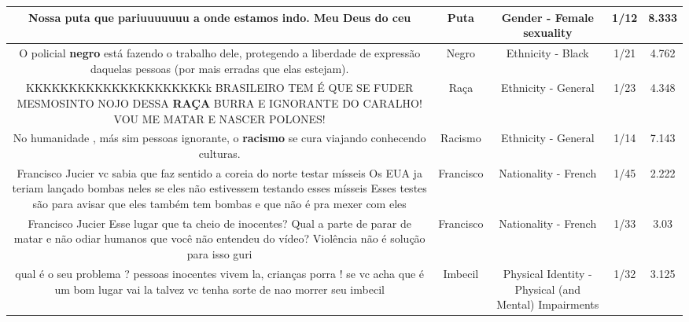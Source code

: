 \documentclass[11pt]{article}
\newlength\mylength
\begin{document}
\begin{center}
\begin{longtable}{|C{.65\mylength}|C{.30\mylength}|C{.12\mylength}|C{.12\mylength}|C{.12\mylength}|}
  \small Nossa \textbf{puta} que pariuuuuuuu  a onde estamos indo. Meu Deus do ceu\normalsize   & Puta & Gender - Female sexuality & 1/12 & 8.333 \\  \hline
  \small O policial \textbf{negro} está fazendo o trabalho dele, protegendo a liberdade de expressão daquelas pessoas (por mais erradas que elas estejam).\normalsize   & Negro & Ethnicity - Black & 1/21 & 4.762 \\  \hline
  \small KKKKKKKKKKKKKKKKKKKKKk BRASILEIRO TEM É QUE SE FUDER MESMOSINTO NOJO DESSA \textbf{RAÇA} BURRA E IGNORANTE DO CARALHO! VOU ME MATAR E NASCER POLONES!\normalsize   & Raça & Ethnicity - General & 1/23 & 4.348 \\  \hline
  \small No humanidade , más sim pessoas ignorante, o \textbf{racismo} se cura viajando conhecendo culturas.\normalsize   & Racismo & Ethnicity - General & 1/14 & 7.143 \\  \hline
  \small Francisco Jucier vc sabia que faz sentido a coreia do norte testar mísseis Os EUA ja teriam lançado bombas neles se eles não estivessem testando esses mísseis Esses testes são para avisar que eles também tem bombas  e que não é pra mexer com eles\normalsize   & Francisco & Nationality - French & 1/45 & 2.222 \\  \hline
  \small Francisco Jucier Esse lugar que ta cheio de inocentes? Qual a parte de parar de matar e não odiar humanos que você não entendeu do vídeo? Violência não é solução para isso guri\normalsize   & Francisco & Nationality - French & 1/33 & 3.03 \\  \hline
  \small qual é o seu problema ? pessoas inocentes vivem la, crianças porra ! se vc acha que é um bom lugar vai la talvez vc tenha sorte de nao morrer seu imbecil\normalsize   & Imbecil & Physical Identity - Physical (and Mental) Impairments & 1/32 & 3.125 \\  \hline

\end{longtable}
\end{center}
\end{document}
